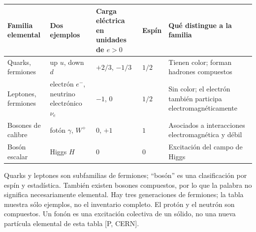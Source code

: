 \documentclass[
  spanish,
  10pt,
  a4paper,
]{article}
\newcounter{none} %
\begin{document}
{\def\LTcaptype{none} %
\begin{longtable}[]{@{}
  >{\raggedright\arraybackslash}p{}
  >{\raggedright\arraybackslash}p{}
  >{\raggedright\arraybackslash}p{}
  >{\raggedright\arraybackslash}p{}
  >{\raggedright\arraybackslash}p{}@{}}
\toprule\noalign{}
\begin{minipage}[b]{\linewidth}\raggedright
Familia elemental
\end{minipage} & \begin{minipage}[b]{\linewidth}\raggedright
Dos ejemplos
\end{minipage} & \begin{minipage}[b]{\linewidth}\raggedright
Carga eléctrica en unidades de \(e>0\)
\end{minipage} & \begin{minipage}[b]{\linewidth}\raggedright
Espín
\end{minipage} & \begin{minipage}[b]{\linewidth}\raggedright
Qué distingue a la familia
\end{minipage} \\
\midrule\noalign{}
\endhead
\bottomrule\noalign{}
\endlastfoot
Quarks, fermiones & up \(u\), down \(d\) & \(+2/3\), \(-1/3\) & \(1/2\)
& Tienen color; forman hadrones compuestos \\
Leptones, fermiones & electrón \(e^-\), neutrino electrónico \(\nu_e\) &
\(-1\), \(0\) & \(1/2\) & Sin color; el electrón también participa
electromagnéticamente \\
Bosones de calibre & fotón \(\gamma\), \(W^+\) & \(0\), \(+1\) & \(1\) &
Asociados a interacciones electromagnética y débil \\
Bosón escalar & Higgs \(H\) & \(0\) & \(0\) & Excitación del campo de
Higgs \\
\end{longtable}
}

Quarks y leptones son subfamilias de fermiones; ``bosón'' es una
clasificación por espín y estadística. También existen bosones
compuestos, por lo que la palabra no significa necesariamente elemental.
Hay tres generaciones de fermiones; la tabla muestra sólo ejemplos, no
el inventario completo. El protón y el neutrón son compuestos. Un fonón
es una excitación colectiva de un sólido, no una nueva partícula
elemental de esta tabla {[}P, CERN{]}.
\end{document}
